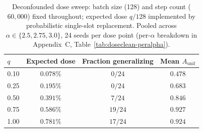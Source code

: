 \documentclass[11pt]{article}
\begin{document}
\begin{table}[t]
\centering
\caption{Deconfounded dose sweep: batch size (128) and step count ($60{,}000$) fixed throughout; expected dose $q/128$ implemented by probabilistic single-slot replacement. Pooled across $\alpha\in\{2.5,2.75,3.0\}$, 24 seeds per dose point (per-$\alpha$ breakdown in Appendix~C, Table~\ref{tab:doseclean-peralpha}).}
\label{tab:doseclean}
\begin{tabular}{lccc}
\toprule
$q$ & Expected dose & Fraction generalizing & Mean $A_{\mathrm{unif}}$ \\
\midrule
0.10 & $0.078\%$ & $0/24$ & $0.478$ \\
0.25 & $0.195\%$ & $0/24$ & $0.683$ \\
0.50 & $0.391\%$ & $7/24$ & $0.846$ \\
0.75 & $0.586\%$ & $19/24$ & $0.927$ \\
1.00 & $0.781\%$ & $17/24$ & $0.924$ \\
\bottomrule
\end{tabular}
\end{table}
\end{document}
